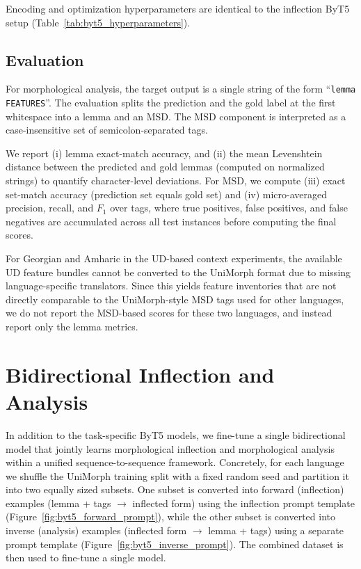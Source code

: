 Encoding and optimization hyperparameters are identical to the inflection ByT5 setup (Table~\ref{tab:byt5_hyperparameters}).

\subsection{Evaluation}
\label{sec:analysis-eval}
For morphological analysis, the target output is a single string of the form ``\texttt{lemma FEATURES}''. The evaluation splits the prediction and the gold label at the first whitespace into a lemma and an \ac{MSD}. The \ac{MSD} component is interpreted as a case-insensitive set of semicolon-separated tags.

We report (i) lemma exact-match accuracy, and (ii) the mean Levenshtein distance between the predicted and gold lemmas (computed on normalized strings) to quantify character-level deviations. For \ac{MSD}, we compute (iii) exact set-match accuracy (prediction set equals gold set) and (iv) micro-averaged precision, recall, and $F_1$ over tags, where true positives, false positives, and false negatives are accumulated across all test instances before computing the final scores.

For Georgian and Amharic in the \ac{UD}-based context experiments, the available \ac{UD} feature bundles cannot be converted to the UniMorph format due to missing language-specific translators. Since this yields feature inventories that are not directly comparable to the UniMorph-style \ac{MSD} tags used for other languages, we do not report the \ac{MSD}-based scores for these two languages, and instead report only the lemma metrics.

\section{Bidirectional Inflection and Analysis}
\label{sec:bidirectional}

In addition to the task-specific ByT5 models, we fine-tune a single bidirectional model that jointly learns morphological inflection and morphological analysis within a unified sequence-to-sequence framework. Concretely, for each language we shuffle the UniMorph training split with a fixed random seed and partition it into two equally sized subsets. One subset is converted into forward (inflection) examples (lemma + tags $\rightarrow$ inflected form) using the inflection prompt template (Figure~\ref{fig:byt5_forward_prompt}), while the other subset is converted into inverse (analysis) examples (inflected form $\rightarrow$ lemma + tags) using a separate prompt template (Figure~\ref{fig:byt5_inverse_prompt}). The combined dataset is then used to fine-tune a single model.

